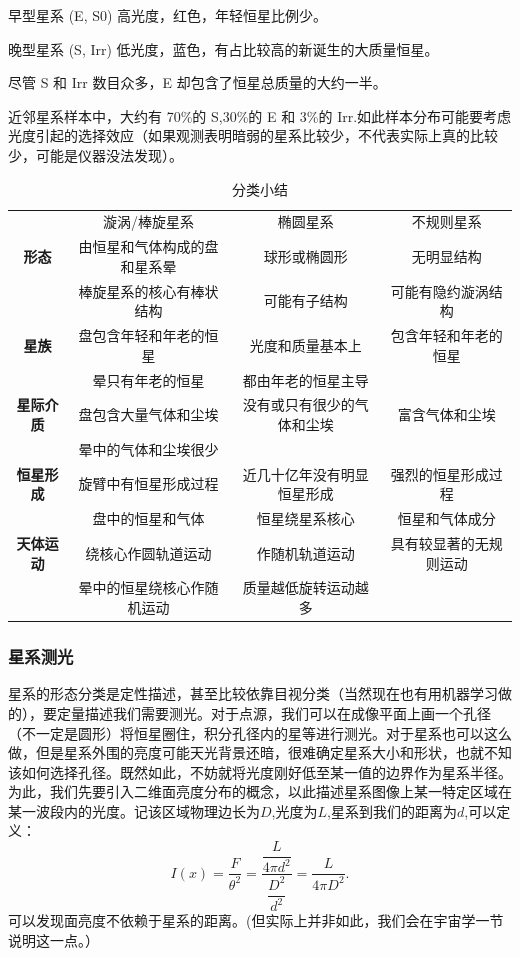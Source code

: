 \documentclass[../天体物理基础.tex]{subfiles}
\begin{document}
早型星系 (E, S0) 高光度，红色，年轻恒星比例少。

晚型星系 (S, Irr) 低光度，蓝色，有占比较高的新诞生的大质量恒星。

尽管 S 和 Irr 数目众多，E 却包含了恒星总质量的大约一半。

近邻星系样本中，大约有 70\%的 S,30\%的 E 和 3\%的 Irr.如此样本分布可能要考虑光度引起的选择效应（如果观测表明暗弱的星系比较少，不代表实际上真的比较少，可能是仪器没法发现）。

\begin{table}[htbp]
\centering
\caption{分类小结}
\begin{tabular}{c c c c}
\hline
 & 漩涡/棒旋星系 & 椭圆星系 & 不规则星系\\
\cline{1-4}
\textbf{形态} & 由恒星和气体构成的盘和星系晕 & 球形或椭圆形 & 无明显结构\\
 & 棒旋星系的核心有棒状结构 & 可能有子结构 & 可能有隐约漩涡结构\\
\cline{1-4}
\textbf{星族} & 盘包含年轻和年老的恒星 & 光度和质量基本上 & 包含年轻和年老的恒星\\
 & 晕只有年老的恒星 & 都由年老的恒星主导 & \\
\cline{1-4}
\textbf{星际介质} & 盘包含大量气体和尘埃 & 没有或只有很少的气体和尘埃 & 富含气体和尘埃\\
 & 晕中的气体和尘埃很少 &  & \\
\cline{1-4}
\textbf{恒星形成} & 旋臂中有恒星形成过程 & 近几十亿年没有明显恒星形成 & 强烈的恒星形成过程\\
\cline{1-4}
 & 盘中的恒星和气体 & 恒星绕星系核心 & 恒星和气体成分\\
\textbf{天体运动} & 绕核心作圆轨道运动 & 作随机轨道运动 & 具有较显著的无规则运动\\
 & 晕中的恒星绕核心作随机运动 & 质量越低旋转运动越多 & \\
\cline{1-4}
\end{tabular}
\label{2}
\end{table}

\subsubsection{星系测光}
星系的形态分类是定性描述，甚至比较依靠目视分类（当然现在也有用机器学习做的），要定量描述我们需要测光。对于点源，我们可以在成像平面上画一个孔径（不一定是圆形）将恒星圈住，积分孔径内的星等进行测光。对于星系也可以这么做，但是星系外围的亮度可能天光背景还暗，很难确定星系大小和形状，也就不知该如何选择孔径。既然如此，不妨就将光度刚好低至某一值的边界作为星系半径。为此，我们先要引入二维面亮度分布的概念，以此描述星系图像上某一特定区域在某一波段内的光度。记该区域物理边长为$D$,光度为$L$,星系到我们的距离为$d$,可以定义：
\begin{equation}
I\left(x\right)=\frac{F}{\theta^{2}}=\dfrac{\dfrac{L}{4\pi{}d^{2}}}{\dfrac{D^{2}}{d^{2}}}=\frac{L}{4\pi{}D^{2}}.\label{1.5.2}
\end{equation}
可以发现面亮度不依赖于星系的距离。(但实际上并非如此，我们会在宇宙学一节说明这一点。）
\end{document}
